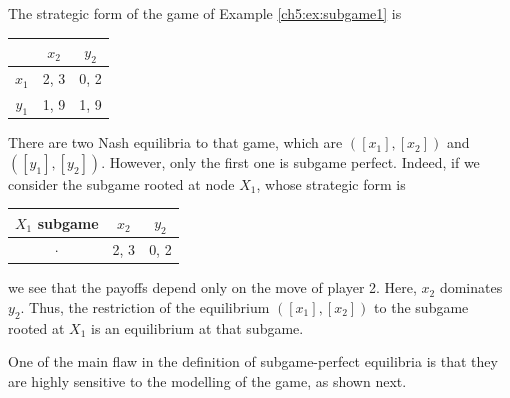 \begin{example}
The strategic form of the game of Example \ref{ch5:ex:subgame1}
is 
\begin{center}
\begin{tabular}{c|cc}
& $x_2$ & $y_2$ \\
\hline 
$x_1$ & 2,  3 & 0, 2 \\
$y_1$ & 1, 9 & 1, 9
\end{tabular}
\end{center}
There are two Nash equilibria to that game, which are $([x_1], [x_2])$ and $([y_1], [y_2])$. However, only the first one is subgame perfect. Indeed, if we consider the subgame rooted at node $X_1$, whose strategic form is 
\begin{center}
\begin{tabular}{c|cc}
$X_1$ subgame & $x_2$ & $y_2$ \\
\hline
$\cdot$ & 2, 3 & 0, 2 \\
\end{tabular}
\end{center}
we see that the payoffs depend only on the move of player 2. Here, $x_2$ dominates $y_2$. Thus, the restriction of the equilibrium $([x_1], [x_2])$ to the subgame rooted at $X_1$ is an equilibrium at that subgame.\\
\end{example}
One of the main flaw in the definition of subgame-perfect equilibria is that they are highly sensitive to the modelling of the game, as shown next.
